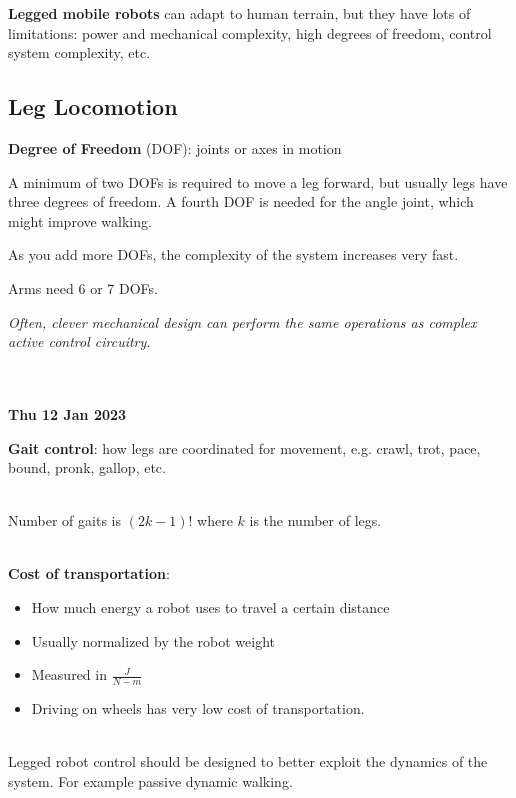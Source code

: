 \documentclass[13pt]{article}
\begin{document}
\noindent
\textbf{Legged mobile robots} can adapt to human terrain, but they have lots of limitations: power and mechanical complexity,
high degrees of freedom, control system complexity, etc.

\subsection{Leg Locomotion}%
\noindent
\textbf{Degree of Freedom} (DOF): joints or axes in motion

\hfill

\noindent
A minimum of two DOFs is required to move a leg forward, but usually legs have three degrees of freedom. A fourth DOF is
needed for the angle joint, which might improve walking.

\hfill

\noindent
As you add more DOFs, the complexity of the system increases very fast.

\hfill

\noindent
Arms need 6 or 7 DOFs.

\hfill

\noindent
\textit{Often, clever mechanical design can perform the same operations as complex active control circuitry.}

\hfill \\ \hfill \\

\hfill \textbf{Thu 12 Jan 2023}

\noindent
\textbf{Gait control}: how legs are coordinated for movement, e.g. crawl, trot, pace, bound, pronk, gallop, etc.

\hfill \\
\noindent
Number of gaits is $(2k - 1)!$ where $k$ is the number of legs.

\hfill \\
\noindent
\textbf{Cost of transportation}:
\begin{itemize}
	\item How much energy a robot uses to travel a certain distance
	\item Usually normalized by the robot weight
	\item Measured in $\frac{J}{N-m}$
	\item Driving on wheels has very low cost of transportation.
\end{itemize}

\hfill \\
\noindent
Legged robot control should be designed to better exploit the dynamics of the system. For example passive dynamic
walking.
\end{document}
